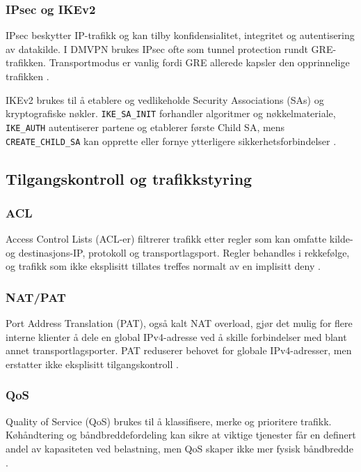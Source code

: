 \subsubsection{IPsec og IKEv2}

IPsec beskytter IP-trafikk og kan tilby konfidensialitet, integritet og autentisering av datakilde. I DMVPN brukes IPsec ofte som tunnel protection rundt GRE-trafikken. Transportmodus er vanlig fordi GRE allerede kapsler den opprinnelige trafikken \cite{rfc4301,cisco_dmvpn_ipsec_transport}.

IKEv2 brukes til å etablere og vedlikeholde Security Associations (SAs) og kryptografiske nøkler. \texttt{IKE\_SA\_INIT} forhandler algoritmer og nøkkelmateriale, \texttt{IKE\_AUTH} autentiserer partene og etablerer første Child SA, mens \texttt{CREATE\_CHILD\_SA} kan opprette eller fornye ytterligere sikkerhetsforbindelser \cite{rfc7296}.

\subsection{Tilgangskontroll og trafikkstyring}

\subsubsection{ACL}

Access Control Lists (ACL-er) filtrerer trafikk etter regler som kan omfatte kilde- og destinasjons-IP, protokoll og transportlagsport. Regler behandles i rekkefølge, og trafikk som ikke eksplisitt tillates treffes normalt av en implisitt deny \cite{forsvaret_nettverk_rolle1}.

\subsubsection{NAT/PAT}

Port Address Translation (PAT), også kalt NAT overload, gjør det mulig for flere interne klienter å dele en global IPv4-adresse ved å skille forbindelser med blant annet transportlagsporter. PAT reduserer behovet for globale IPv4-adresser, men erstatter ikke eksplisitt tilgangskontroll \cite{cisco_pat}.

\subsubsection{QoS}

Quality of Service (QoS) brukes til å klassifisere, merke og prioritere trafikk. Køhåndtering og båndbreddefordeling kan sikre at viktige tjenester får en definert andel av kapasiteten ved belastning, men QoS skaper ikke mer fysisk båndbredde \cite{cisco_qos}.

